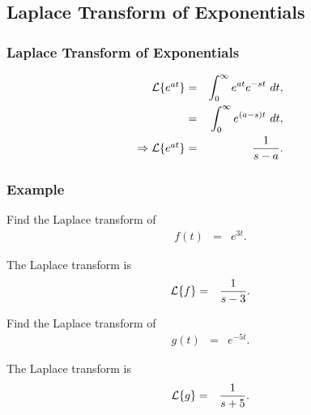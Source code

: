 \subsection{Laplace Transform of Exponentials}

\begin{frame}
  \frametitle{Laplace Transform of Exponentials}

  \begin{eqnarray*}
    \laplace{e^{at}} & = & \int^\infty_0 e^{at} e^{-st} ~ dt, \\
    & = & \int^\infty_0 e^{(a-s)t} ~ dt, \\
    \Rightarrow \laplace{e^{at}} & = & \frac{1}{s-a}.
  \end{eqnarray*}

\end{frame}


\begin{frame}
  \frametitle{Example}

  Find the Laplace transform of 
  \begin{eqnarray*}
    f(t) & = & e^{3t}.
  \end{eqnarray*}

  {
    
    The Laplace transform is
    \begin{eqnarray*}
      \laplace{f} & = & \frac{1}{s-3}.
    \end{eqnarray*}

  }

  {
    Find the Laplace transform of 
    \begin{eqnarray*}
      g(t) & = & e^{-5t}.
    \end{eqnarray*}

  }

  {
    The Laplace transform is
    \begin{eqnarray*}
      \laplace{g} & = & \frac{1}{s+5}.
    \end{eqnarray*}
  }


\end{frame}


